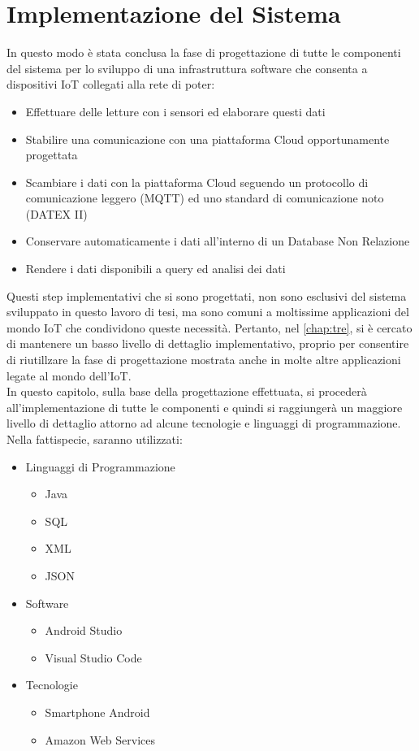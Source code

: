 \chapter{Implementazione del Sistema}
\label{chap:quattro}
In questo modo è stata conclusa la fase di progettazione di tutte le componenti del sistema per lo sviluppo di una infrastruttura software che consenta a dispositivi IoT collegati alla rete di poter:
\begin{itemize}
	\item Effettuare delle letture con i sensori ed elaborare questi dati
	\item Stabilire una comunicazione con una piattaforma Cloud opportunamente progettata
	\item Scambiare i dati con la piattaforma Cloud seguendo un protocollo di comunicazione leggero (MQTT) ed uno standard di comunicazione noto (DATEX II)
	\item Conservare automaticamente i dati all'interno di un Database Non Relazione 
	\item Rendere i dati disponibili a query ed analisi dei dati
\end{itemize}
Questi step implementativi che si sono progettati, non sono esclusivi del sistema sviluppato in questo lavoro di tesi, ma sono comuni a moltissime applicazioni del mondo IoT che condividono queste necessità. Pertanto, nel \autoref{chap:tre}, si è cercato di mantenere un basso livello di dettaglio implementativo, proprio per consentire di riutillzare la fase di progettazione mostrata anche in molte altre applicazioni legate al mondo dell'IoT.\\
In questo capitolo, sulla base della progettazione effettuata, si procederà all'implementazione di tutte le componenti e quindi si raggiungerà un maggiore livello di dettaglio attorno ad alcune tecnologie e linguaggi di programmazione. Nella fattispecie, saranno utilizzati:
\begin{itemize}
	\item Linguaggi di Programmazione
	\begin{itemize}
		\item Java
		\item SQL
		\item XML
		\item JSON
	\end{itemize}
	\item Software
	\begin{itemize}
		\item Android Studio
		\item Visual Studio Code
	\end{itemize}
	\item Tecnologie
	\begin{itemize}
		\item Smartphone Android
		\item Amazon Web Services
	\end{itemize}
\end{itemize}
